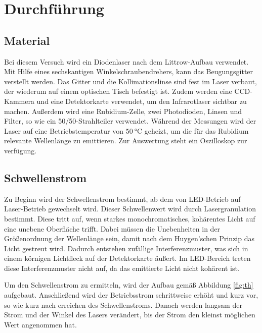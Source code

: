 
\section{Durchführung}
\label{sec:Durchführung}

\subsection{Material}
Bei diesem Versuch wird ein Diodenlaser nach dem Littrow-Aufbau verwendet. 
Mit Hilfe eines sechskantigen Winkelschraubendrehers, kann das Beugungsgitter verstellt werden.
Das Gitter und die Kollimationslinse sind fest im Laser verbaut, der wiederum auf einem optischen Tisch befestigt ist.
Zudem werden eine CCD-Kammera und eine Detektorkarte verwendet, um den Infrarotlaser sichtbar zu machen.
Außerdem wird eine Rubidium-Zelle, zwei Photodioden, Linsen und Filter, so wie ein 50/50-Strahlteiler verwendet.
Während der Messungen wird der Laser auf eine Betriebstemperatur von $\SI{50}{\celsius}$ geheizt, um die für das Rubidium relevante Wellenlänge zu emittieren.
Zur Auswertung steht ein Oszilloskop zur verfügung.



\subsection{Schwellenstrom}
\label{sec:schwellenstrom}

Zu Beginn wird der Schwellenstrom bestimmt, ab dem von LED-Betrieb auf Laser-Betrieb gewechselt wird.
Dieser Schwellenwert wird durch Lasergranulation bestimmt.
Diese tritt auf, wenn starkes monochromatisches, kohärentes Licht auf eine unebene Oberfläche trifft.
Dabei müssen die Unebenheiten in der Größenordnung der Wellenlänge sein, damit nach dem Huygen'schen Prinzip das Licht gestreut wird.
Dadurch entstehen zufällige Interferenzmuster, was sich in einem körnigen Lichtfleck auf der Detektorkarte äußert.
Im LED-Bereich treten diese Interferenzmuster nicht auf, da das emittierte Licht nicht kohärent ist.

Um den Schwellenstrom zu ermitteln, wird der Aufbau gemäß Abbildung \ref{fig:th} aufgebaut.
Anschließend wird der Betriebsstrom schrittweise erhöht und kurz vor, so wie kurz nach erreichen des Schwellenstroms.
Danach werden langsam der Strom und der Winkel des Lasers verändert, bis der Strom den kleinst möglichen Wert angenommen hat.

